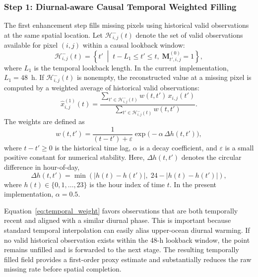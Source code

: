 \documentclass[12pt,reqno]{amsart}
\begin{document}
\subsubsection*{Step 1: Diurnal-aware Causal Temporal Weighted Filling}

The first enhancement step fills missing pixels using historical valid observations at the same spatial location. Let $\mathcal{H}^{-}_{i,j}(t)$ denote the set of valid observations available for pixel $(i,j)$ within a causal lookback window:
\begin{equation}
\mathcal{H}^{-}_{i,j}(t)=
\left\{
t' \;\middle|\; t-L_1 \le t' \le t,\; \mathbf{M}^{(0)}_{t',i,j}=1
\right\},
\end{equation}
where $L_1$ is the temporal lookback length. In the current implementation, $L_1=48$~h. If $\mathcal{H}^{-}_{i,j}(t)$ is nonempty, the reconstructed value at a missing pixel is computed by a weighted average of historical valid observations:
\begin{equation}
\hat{x}^{(1)}_{i,j}(t)=
\frac{\sum_{t'\in\mathcal{H}^{-}_{i,j}(t)} w(t,t')\,x_{i,j}(t')}
{\sum_{t'\in\mathcal{H}^{-}_{i,j}(t)} w(t,t')}.
\end{equation}
The weights are defined as
\begin{equation}
w(t,t')=\frac{1}{(t-t')+\varepsilon}\exp\bigl(-\alpha\,\Delta h(t,t')\bigr),
\label{eq:temporal_weight}
\end{equation}
where $t-t' \ge 0$ is the historical time lag, $\alpha$ is a decay coefficient, and $\varepsilon$ is a small positive constant for numerical stability. Here, $\Delta h(t,t')$ denotes the circular difference in hour-of-day,
\begin{equation}
\Delta h(t,t')=
\min\!\left(\left|h(t)-h(t')\right|,\; 24-\left|h(t)-h(t')\right|\right),
\end{equation}
where $h(t)\in\{0,1,\ldots,23\}$ is the hour index of time $t$. In the present implementation, $\alpha=0.5$.

Equation~\eqref{eq:temporal_weight} favors observations that are both temporally recent and aligned with a similar diurnal phase. This is important because standard temporal interpolation can easily alias upper-ocean diurnal warming. If no valid historical observation exists within the 48-h lookback window, the point remains unfilled and is forwarded to the next stage. The resulting temporally filled field provides a first-order proxy estimate and substantially reduces the raw missing rate before spatial completion.
\end{document}
